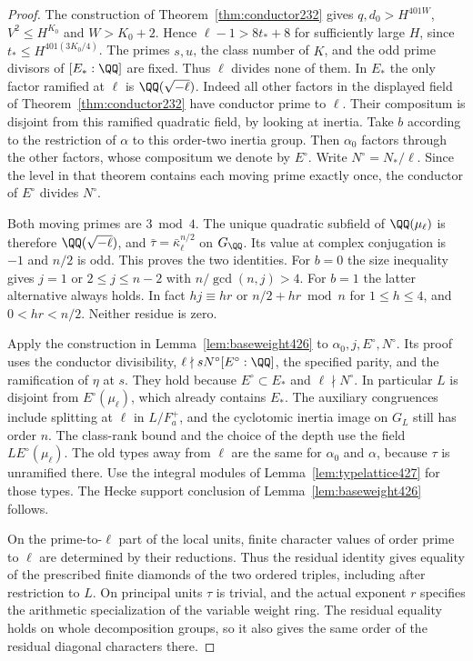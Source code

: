 \documentclass[a4paper,11pt]{article}
\theoremstyle{definition}
\theoremstyle{remark}
\numberwithin{equation}{section}
\begin{document}
\begin{proof}
The construction of Theorem~\ref{thm:conductor232} gives
\(q,d_0>H^{401W}\), \(V^2\le H^{K_0}\) and \(W>K_0+2\).
Hence \(\ell-1>8t_*+8\) for sufficiently large \(H\), since
\(t_*\le H^{401(3K_0/4)}\). The primes \(s,u\), the class
number of \(K\), and the odd prime divisors of \([E_*:\QQ]\)
are fixed. Thus \(\ell\) divides none of them. In \(E_*\) the
only factor ramified at \(\ell\) is \(\QQ(\sqrt{-\ell})\).
Indeed all other factors in the displayed field of
Theorem~\ref{thm:conductor232} have conductor prime to \(\ell\).
Their compositum is disjoint from this ramified quadratic field,
by looking at inertia. Take \(b\) according to the restriction
of \(\alpha\) to this order-two inertia group. Then \(\alpha_0\)
factors through the other factors, whose compositum we denote
by \(E^\circ\). Write \(N^\circ=N_*/\ell\). Since the level in
that theorem contains each moving prime exactly once, the
conductor of \(E^\circ\) divides \(N^\circ\).

Both moving primes are \(3\bmod 4\). The unique quadratic
subfield of \(\QQ(\mu_\ell)\) is therefore
\(\QQ(\sqrt{-\ell})\), and \(\bar\tau=\bar\kappa_\ell^{n/2}\)
on \(G_\QQ\). Its value at complex conjugation is \(-1\)
and \(n/2\) is odd. This proves the two identities. For
\(b=0\) the size inequality gives \(j=1\) or
\(2\le j\le n-2\) with \(n/\gcd(n,j)>4\).
For \(b=1\) the latter alternative always holds. In fact
\(hj\equiv hr\) or \(n/2+hr\bmod n\) for \(1\le h\le4\),
and \(0<hr<n/2\). Neither residue is zero.

Apply the construction in Lemma~\ref{lem:baseweight426} to
\(\alpha_0,j,E^\circ,N^\circ\). Its proof uses the conductor
divisibility, \(\ell\nmid sN^\circ[E^\circ:\QQ]\), the
specified parity, and the ramification of \(\eta\) at \(s\).
They hold because \(E^\circ\subset E_*\) and \(\ell\nmid N^\circ\).
In particular \(L\) is disjoint from \(E^\circ(\mu_\ell)\),
which already contains \(E_*\). The auxiliary congruences
include splitting at \(\ell\) in \(L/F_a^+\), and the
cyclotomic inertia image on \(G_L\) still has order \(n\).
The class-rank bound and the choice of the depth use the field
\(L E^\circ(\mu_\ell)\). The old types away from \(\ell\)
are the same for \(\alpha_0\) and \(\alpha\), because \(\tau\)
is unramified there. Use the integral modules of
Lemma~\ref{lem:typelattice427} for those types. The Hecke
support conclusion of Lemma~\ref{lem:baseweight426} follows.

On the prime-to-\(\ell\) part of the local units, finite
character values of order prime to \(\ell\) are determined
by their reductions. Thus the residual identity gives equality
of the prescribed finite diamonds of the two ordered triples,
including after restriction to \(L\). On principal units
\(\tau\) is trivial, and the actual exponent \(r\) specifies
the arithmetic specialization of the variable weight ring.
The residual equality holds on whole decomposition groups,
so it also gives the same order of the residual diagonal
characters there.
\end{proof}
\end{document}
